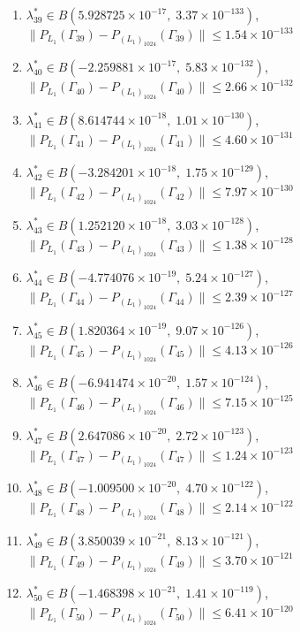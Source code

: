\begin{enumerate}
\item $\lambda_{39}^* \in B(5.928725 \times 10^{-17},\; 3.37 \times 10^{-133})$, \quad $\|P_{L_1}(\Gamma_{39}) - P_{(L_1)_{1024}}(\Gamma_{39})\| \leq 1.54 \times 10^{-133}$
\item $\lambda_{40}^* \in B(-2.259881 \times 10^{-17},\; 5.83 \times 10^{-132})$, \quad $\|P_{L_1}(\Gamma_{40}) - P_{(L_1)_{1024}}(\Gamma_{40})\| \leq 2.66 \times 10^{-132}$
\item $\lambda_{41}^* \in B(8.614744 \times 10^{-18},\; 1.01 \times 10^{-130})$, \quad $\|P_{L_1}(\Gamma_{41}) - P_{(L_1)_{1024}}(\Gamma_{41})\| \leq 4.60 \times 10^{-131}$
\item $\lambda_{42}^* \in B(-3.284201 \times 10^{-18},\; 1.75 \times 10^{-129})$, \quad $\|P_{L_1}(\Gamma_{42}) - P_{(L_1)_{1024}}(\Gamma_{42})\| \leq 7.97 \times 10^{-130}$
\item $\lambda_{43}^* \in B(1.252120 \times 10^{-18},\; 3.03 \times 10^{-128})$, \quad $\|P_{L_1}(\Gamma_{43}) - P_{(L_1)_{1024}}(\Gamma_{43})\| \leq 1.38 \times 10^{-128}$
\item $\lambda_{44}^* \in B(-4.774076 \times 10^{-19},\; 5.24 \times 10^{-127})$, \quad $\|P_{L_1}(\Gamma_{44}) - P_{(L_1)_{1024}}(\Gamma_{44})\| \leq 2.39 \times 10^{-127}$
\item $\lambda_{45}^* \in B(1.820364 \times 10^{-19},\; 9.07 \times 10^{-126})$, \quad $\|P_{L_1}(\Gamma_{45}) - P_{(L_1)_{1024}}(\Gamma_{45})\| \leq 4.13 \times 10^{-126}$
\item $\lambda_{46}^* \in B(-6.941474 \times 10^{-20},\; 1.57 \times 10^{-124})$, \quad $\|P_{L_1}(\Gamma_{46}) - P_{(L_1)_{1024}}(\Gamma_{46})\| \leq 7.15 \times 10^{-125}$
\item $\lambda_{47}^* \in B(2.647086 \times 10^{-20},\; 2.72 \times 10^{-123})$, \quad $\|P_{L_1}(\Gamma_{47}) - P_{(L_1)_{1024}}(\Gamma_{47})\| \leq 1.24 \times 10^{-123}$
\item $\lambda_{48}^* \in B(-1.009500 \times 10^{-20},\; 4.70 \times 10^{-122})$, \quad $\|P_{L_1}(\Gamma_{48}) - P_{(L_1)_{1024}}(\Gamma_{48})\| \leq 2.14 \times 10^{-122}$
\item $\lambda_{49}^* \in B(3.850039 \times 10^{-21},\; 8.13 \times 10^{-121})$, \quad $\|P_{L_1}(\Gamma_{49}) - P_{(L_1)_{1024}}(\Gamma_{49})\| \leq 3.70 \times 10^{-121}$
\item $\lambda_{50}^* \in B(-1.468398 \times 10^{-21},\; 1.41 \times 10^{-119})$, \quad $\|P_{L_1}(\Gamma_{50}) - P_{(L_1)_{1024}}(\Gamma_{50})\| \leq 6.41 \times 10^{-120}$
\end{enumerate}
